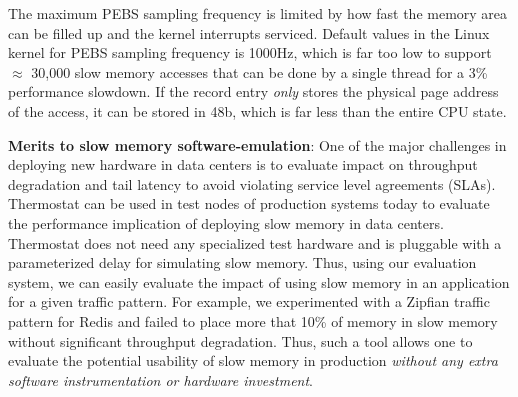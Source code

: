The maximum PEBS sampling frequency is limited by
how fast the memory area can be filled up and the kernel interrupts serviced.
Default values in the Linux kernel for PEBS sampling frequency is 1000Hz, which
is far too low to support $\approx$ 30,000 slow memory accesses that can be done
by a single thread for a 3\% performance slowdown. If the record entry {\it
only} stores the physical page address of the access, it can be stored in 48b,
which is far less than the entire CPU state.


\textbf{Merits to slow memory software-emulation}: One of the major challenges in
deploying new hardware in data centers is to evaluate impact on throughput
degradation and tail latency to avoid violating service level agreements
(SLAs). Thermostat can be used in test nodes of production systems today to
evaluate the performance implication of deploying slow memory in data centers.
Thermostat does not need any specialized test hardware and is pluggable with
a parameterized delay for simulating slow memory. Thus, using our evaluation system,
we can easily evaluate the impact of using slow memory in an application for a given
traffic pattern. For example, we experimented with a Zipfian traffic pattern for Redis
and failed to place more that 10\% of memory in slow memory without significant
throughput degradation. Thus, such a tool allows one to evaluate the potential
usability of slow memory in production {\it without any extra software
instrumentation or hardware investment}.

%

